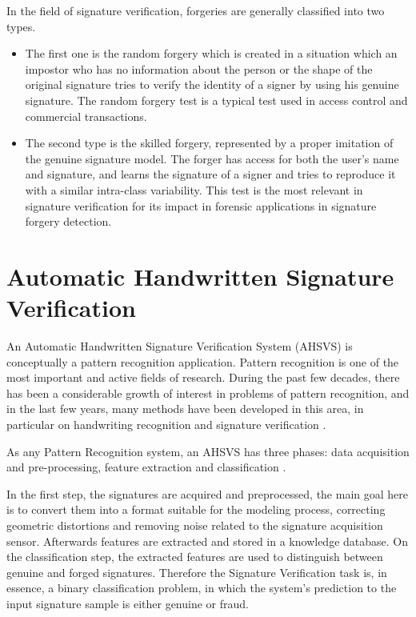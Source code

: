 In the field of signature verification, forgeries are generally classified into two types. 
\begin{itemize}
\item The first one is the random forgery which is created in a situation which an impostor who has no information about the person or the shape of the original signature tries to verify the identity of a signer by using his genuine signature. The random forgery test is a typical test used in access control and commercial transactions. 

\item The second type is the skilled forgery, represented by a proper imitation of the genuine signature model. The forger has access for both the user’s name and signature, and learns the signature of a signer and tries to reproduce it with a similar intra-class variability. This test is the most relevant in signature verification for its impact in forensic applications in signature forgery detection. 
 
\end{itemize}




\section{Automatic Handwritten Signature Verification}
An Automatic Handwritten Signature Verification System (AHSVS) is conceptually a pattern recognition application. Pattern recognition is one of the most important and active fields of research. During the past few decades, there has been a considerable growth of interest in problems of pattern recognition, and in the last few years, many methods have been developed in this area, in particular on handwriting recognition and signature verification \cite{book}. 

As any Pattern Recognition system, an AHSVS has three phases: data acquisition and pre-processing, feature extraction and classification \cite{impedovo2008state}.

In the first step, the signatures are acquired and preprocessed, the main goal here is to convert them into a format suitable for the modeling process, correcting geometric distortions and removing noise related to the signature acquisition sensor. Afterwards features are extracted and stored in a knowledge database.  On the classification step, the extracted features are used to distinguish between genuine and forged signatures. Therefore the Signature Verification task is, in essence, a binary classification problem, in which the system's prediction to the input signature sample is either genuine or fraud.

